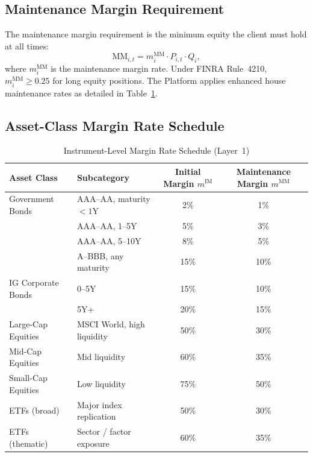 \documentclass[12pt, a4paper]{article}
\newcommand{\IM}{\mathrm{IM}}
\newcommand{\MM}{\mathrm{MM}}
\begin{document}
\subsection{Maintenance Margin Requirement}
\label{subsec:maintenance_margin}

The maintenance margin requirement is the minimum equity the client must
hold at all times:
\begin{equation}
    \MM_{i,t} = m_i^{\MM} \cdot P_{i,t} \cdot Q_i,
    \label{eq:maintenance_margin}
\end{equation}
where $m_i^{\MM}$ is the maintenance margin rate. Under FINRA Rule~4210,
$m_i^{\MM} \geq 0.25$ for long equity positions. The Platform applies
enhanced house maintenance rates as detailed in Table~\ref{tab:margin_rates}.

\subsection{Asset-Class Margin Rate Schedule}
\label{subsec:margin_rates}

\begin{table}[H]
\centering
\caption{Instrument-Level Margin Rate Schedule (Layer~1)}
\label{tab:margin_rates}
\begin{tabular}{llcc}
\toprule
\textbf{Asset Class} & \textbf{Subcategory}
    & \textbf{Initial Margin $m^{\IM}$}
    & \textbf{Maintenance Margin $m^{\MM}$} \\
\midrule
Government Bonds & AAA--AA, maturity $< 1$Y     & 2\%   & 1\%   \\
                 & AAA--AA, 1--5Y                & 5\%   & 3\%   \\
                 & AAA--AA, 5--10Y               & 8\%   & 5\%   \\
                 & A--BBB, any maturity          & 15\%  & 10\%  \\
IG Corporate Bonds & 0--5Y                       & 15\%  & 10\%  \\
                   & 5Y+                         & 20\%  & 15\%  \\
Large-Cap Equities & MSCI World, high liquidity  & 50\%  & 30\%  \\
Mid-Cap Equities   & Mid liquidity               & 60\%  & 35\%  \\
Small-Cap Equities & Low liquidity               & 75\%  & 50\%  \\
ETFs (broad)       & Major index replication     & 50\%  & 30\%  \\
ETFs (thematic)    & Sector / factor exposure    & 60\%  & 35\%  \\
\bottomrule
\end{tabular}
\end{table}
\end{document}
